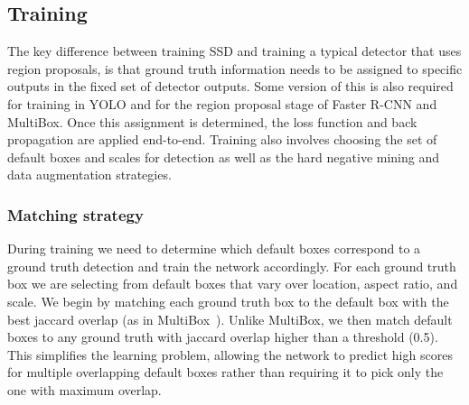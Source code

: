 \documentclass[runningheads]{llncs}
\begin{document}
\subsection{Training}
\label{sec:ssdtraining}

The key difference between training SSD and training a typical detector that uses region proposals, is that ground truth information needs to be assigned to specific outputs in the fixed set of detector outputs. Some version of this is also required for training in YOLO\cite{redmon2015you} and for the region proposal stage of Faster R-CNN\cite{ren2015faster} and MultiBox\cite{erhan2014scalable}. Once this assignment is determined, the loss function and back propagation are applied end-to-end. Training also involves choosing the set of default boxes and scales for detection as well as the hard negative mining and data augmentation strategies.

\subsubsection{Matching strategy}
\label{sec:matchingstrategy}
During training we need to determine which default boxes correspond to a ground truth detection and train the network accordingly.  For each ground truth box we are selecting from default boxes that vary over location, aspect ratio, and scale. We begin by matching each ground truth box to the default box with the best jaccard overlap (as in MultiBox~\cite{erhan2014scalable}). Unlike MultiBox, we then match default boxes to any ground truth with jaccard overlap higher than a threshold (0.5). This simplifies the learning problem, allowing the network to predict high scores for multiple overlapping default boxes rather than requiring it to pick only the one with maximum overlap.
\end{document}
